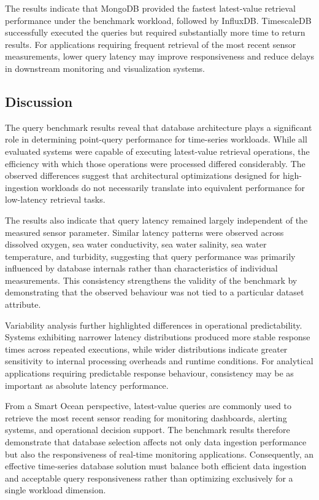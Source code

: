 The results indicate that MongoDB provided the fastest latest-value retrieval performance under the benchmark workload, followed by InfluxDB. TimescaleDB successfully executed the queries but required substantially more time to return results. For applications requiring frequent retrieval of the most recent sensor measurements, lower query latency may improve responsiveness and reduce delays in downstream monitoring and visualization systems.




\subsection{Discussion}
The query benchmark results reveal that database architecture plays a significant role in determining point-query performance for time-series workloads. While all evaluated systems were capable of executing latest-value retrieval operations, the efficiency with which those operations were processed differed considerably. The observed differences suggest that architectural optimizations designed for high-ingestion workloads do not necessarily translate into equivalent performance for low-latency retrieval tasks.

The results also indicate that query latency remained largely independent of the measured sensor parameter. Similar latency patterns were observed across dissolved oxygen, sea water conductivity, sea water salinity, sea water temperature, and turbidity, suggesting that query performance was primarily influenced by database internals rather than characteristics of individual measurements. This consistency strengthens the validity of the benchmark by demonstrating that the observed behaviour was not tied to a particular dataset attribute.

Variability analysis further highlighted differences in operational predictability. Systems exhibiting narrower latency distributions produced more stable response times across repeated executions, while wider distributions indicate greater sensitivity to internal processing overheads and runtime conditions. For analytical applications requiring predictable response behaviour, consistency may be as important as absolute latency performance.


From a Smart Ocean perspective, latest-value queries are commonly used to retrieve the most recent sensor reading for monitoring dashboards, alerting systems, and operational decision support. The benchmark results therefore demonstrate that database selection affects not only data ingestion performance but also the responsiveness of real-time monitoring applications. Consequently, an effective time-series database solution must balance both efficient data ingestion and acceptable query responsiveness rather than optimizing exclusively for a single workload dimension.


